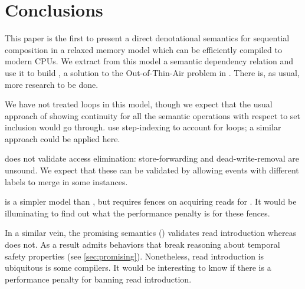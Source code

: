 \section{Conclusions} %

This paper is the first to present a direct denotational semantics for
sequential composition in a relaxed memory model which can be
efficiently compiled to modern CPUs. We extract from this model a semantic dependency relation and use it to build \PwTc, a solution to the Out-of-Thin-Air problem in \cXI. There is, as usual,
more research to be done.

We have not treated loops in this model, though we expect that the usual
approach of showing continuity for all the semantic operations with respect
to set inclusion would go through. \citet{DBLP:conf/esop/PaviottiCPWOB20} use
step-indexing to account for loops; a similar approach could be applied here.

\PwTmca{} does not validate access elimination: store-forwarding and
dead-write-removal are unsound.  We expect that these can be validated by
allowing events with different labels to merge in some instances.

 is a simpler model than , but requires fences on
acquiring reads for \armeight{}.  It would be illuminating to find out what
the performance penalty is for these fences.

In a similar vein, the promising semantics (\PS{}) validates read
introduction whereas \PwTmca{} does not.  As a result \PS{} admits behaviors
that break reasoning about temporal safety properties (see
\textsection\ref{sec:promising}).  Nonetheless, read introduction is
ubiquitous is some compilers.  It would be interesting to know if there is a
performance penalty for banning read introduction.





